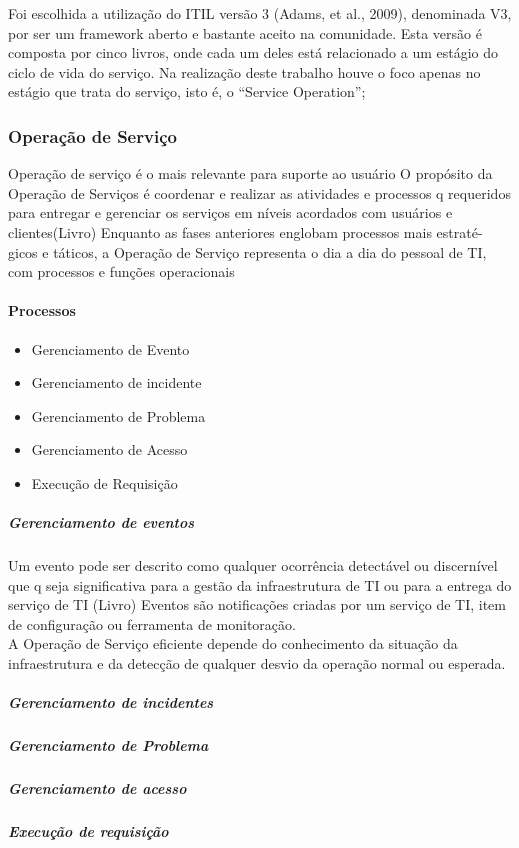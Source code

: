 \documentclass[11pt,a4paper]{article}
\begin{document}
Foi escolhida a utilização do ITIL versão 3 (Adams, et al., 2009), denominada 
V3, por ser um framework aberto e bastante aceito na comunidade. Esta versão é 
composta por cinco livros, onde cada um deles está relacionado a um estágio do 
ciclo de vida do serviço. Na realização deste trabalho houve o foco apenas no 
estágio que trata do serviço, isto é, o “Service Operation”;\\

\subsubsection{Operação de Serviço}
Operação de serviço é o mais relevante para suporte ao usuário
O propósito da Operação de Serviços é coordenar e realizar as atividades e processos q
requeridos para entregar e gerenciar os serviços em níveis acordados com usuários e 
clientes(Livro)
Enquanto as fases anteriores englobam processos mais estraté-
gicos e táticos, a Operação de Serviço representa o dia a dia do pessoal de TI, com processos e 
funções operacionais

\paragraph{Processos}
\begin{itemize}[noitemsep]
	\item Gerenciamento de Evento
	\item Gerenciamento de incidente
	\item Gerenciamento de Problema
	\item Gerenciamento de Acesso
	\item Execução de Requisição
\end{itemize}

\subparagraph{Gerenciamento de eventos}
Um evento pode ser descrito como qualquer ocorrência detectável ou discernível que q
seja significativa para a gestão da infraestrutura de TI ou para a entrega do serviço de TI (Livro)
Eventos são notificações criadas por um serviço de TI, item de configuração ou ferramenta 
de monitoração.\\ A Operação de Serviço eficiente depende do conhecimento da situação 
da infraestrutura e da detecção de qualquer desvio da operação normal ou esperada.


\subparagraph{Gerenciamento de incidentes}
	
\subparagraph{Gerenciamento de Problema}
\subparagraph{Gerenciamento de acesso}
\subparagraph{Execução de requisição}
\end{document}

